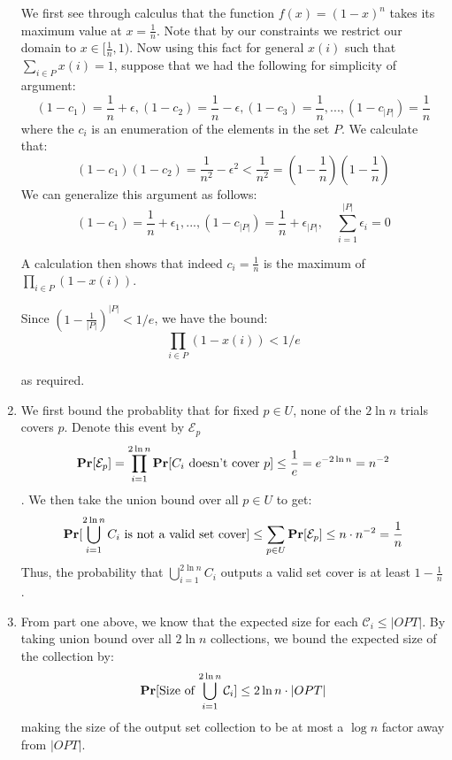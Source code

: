 \documentclass[12pt]{article}%
\begin{document}
\begin{enumerate}
  We first see through calculus that the function $f(x) = (1-x)^n$ takes its maximum value at $x = \frac{1}{n}$. Note that by our constraints we restrict our domain to $x \in [\frac{1}{n},1)$. Now using this fact for general $x(i)$ such that $\sum_{i \in P} x(i) = 1$, suppose that we had the following for simplicity of argument:
  $$ (1-c_1) = \frac{1}{n} + \epsilon, (1-c_2) = \frac{1}{n} - \epsilon, (1-c_3) = \frac{1}{n},...,(1-c_{|P|}) = \frac{1}{n} $$
  where the $c_i$ is an enumeration of the elements in the set $P$. We calculate that:
  $$ (1-c_1)(1-c_2) = \frac{1}{n^2} - \epsilon^2 < \frac{1}{n^2} = (1 - \frac{1}{n})(1 -\frac{1}{n}) $$
  We can generalize this argument as follows:
  $$(1 - c_1) = \frac{1}{n} + \epsilon_1,..., (1-c_{|P|}) = \frac{1}{n} + \epsilon_{|P|}, \quad \sum_{i=1}^{|P|} \epsilon_{i} = 0  $$

  A calculation then shows that indeed $c_i = \frac{1}{n}$ is the maximum of $\prod_{i \in P} (1-x(i))$.

  Since $(1 - \frac{1}{|P|})^{|P|} < 1/e$, we have the bound:
  $$\prod_{i \in P} (1-x(i)) < 1/e $$

  as required.

  \item We first bound the probablity that for fixed $p \in U$, none of the $2 \ln{n}$ trials covers $p$. Denote this event by $\mathcal{E}_p$
  $$ {\bf Pr}[\mathcal{E}_p] = \prod_{i=1}^{2 \ln{n}} {\bf Pr}[C_i \text{ doesn't cover $p$}] \leq \frac{1}{e} = e^{-2 \ln{n}} = n^{-2}$$. We then take the union bound over all $p \in U$ to get:
  $${\bf Pr}[\bigcup_{i=1}^{2 \ln{n}} C_i \text{ is not a valid set cover}] \leq \sum_{p \in U} {\bf Pr}[\mathcal{E}_p] \leq n \cdot n^{-2} = \frac{1}{n} $$
  Thus, the probability that $\bigcup_{i=1}^{2 \ln{n}} C_i$ outputs a valid set cover is at least $1 - \frac{1}{n}$.

  \item From part one above, we know that the expected size for each $\mathcal{C}_i \leq |OPT|$. By taking union bound over all $2 \ln{n}$ collections, we bound the expected size of the collection by:
  $$ {\bf Pr}[\text{Size of $\bigcup_{i=1}^{2 \ln{n}} \mathcal{C}_i$} ] \leq 2 \ln{n} \cdot |OPT| $$ making the size of the output set collection to be at most a $\log{n}$ factor away from $|OPT|$.
\end{enumerate}
\end{document}
